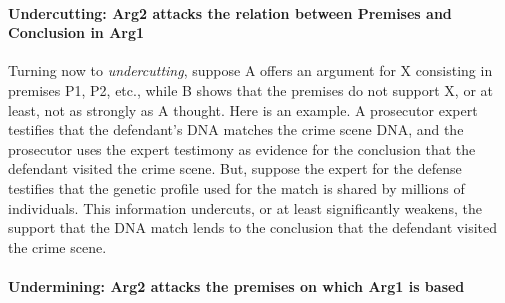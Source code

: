 \documentclass[10pt]{article}
\begin{document}
\paragraph{Undercutting: Arg2 attacks the relation between Premises and Conclusion in Arg1}

Turning now to \textit{undercutting}, suppose A offers an argument for X consisting in premises 
P1, P2, etc., while B shows that the premises do not support X, or at least, not as strongly as A thought. 
 Here is  an example. A prosecutor expert testifies that the defendant's 
 DNA matches the crime scene DNA, and the prosecutor uses the expert testimony as evidence 
 for the conclusion that the defendant visited the crime scene. But, suppose the expert for the defense 
 testifies that the genetic profile used for the match is shared by millions of individuals. This information undercuts, or at least significantly 
 weakens, the support that the DNA match lends to the conclusion that the defendant visited the crime scene. 

\paragraph{Undermining: Arg2 attacks the premises on which Arg1 is based}
\end{document}
